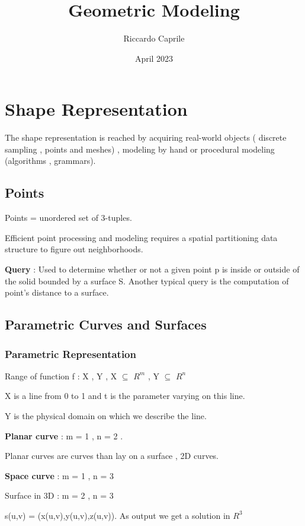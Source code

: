 \documentclass{article}
\title{Geometric  Modeling}
\author{Riccardo Caprile}
\date{April 2023}
\begin{document}
\maketitle

\section{Shape Representation}

The shape representation is reached by acquiring real-world objects ( discrete sampling , points and meshes) , modeling by hand or procedural modeling (algorithms , grammars).


\subsection{Points}

Points = unordered set of 3-tuples.

Efficient point processing and modeling requires a spatial partitioning data structure to figure out neighborhoods. 

\textbf{Query} : Used to determine whether or not a given point p is inside or outside of the solid bounded by a surface S. Another typical query is the computation of point's distance to a surface.

\subsection{Parametric Curves and Surfaces}

\subsubsection{Parametric Representation}

Range of function f : X  , Y , X $\subseteq$ $R^m$ ,  Y $\subseteq$ $R^n$

X is a line from 0 to 1 and t is the parameter varying on this line. 

Y is the physical domain on which we describe the line.

\textbf{Planar curve} : m = 1 , n = 2 .

Planar curves are curves than lay on a surface , 2D curves.

\textbf{Space curve} : m = 1 , n = 3 

Surface in 3D : m = 2 , n = 3 

s(u,v) = (x(u,v),y(u,v),z(u,v)). As output we get a solution in $R^3$
\end{document}
